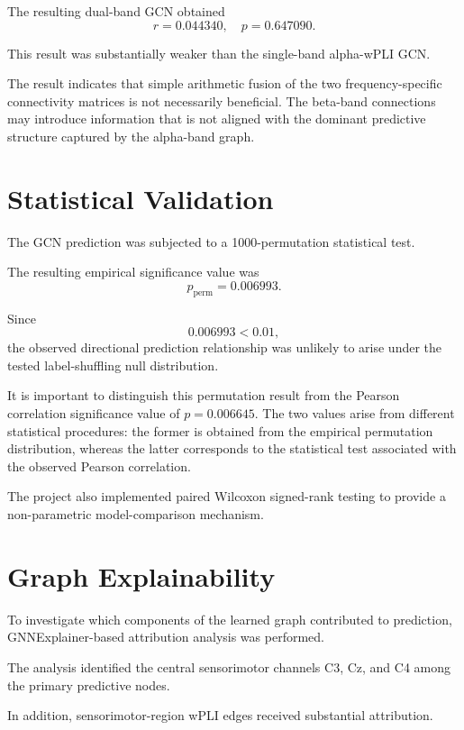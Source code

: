 \documentclass[conference]{IEEEtran}
\begin{document}
The resulting dual-band GCN obtained
\begin{equation}
r = 0.044340, \quad p = 0.647090.
\end{equation}

This result was substantially weaker than the single-band alpha-wPLI GCN.

The result indicates that simple arithmetic fusion of the two frequency-specific connectivity matrices is not necessarily beneficial. The beta-band connections may introduce information that is not aligned with the dominant predictive structure captured by the alpha-band graph.

\section{Statistical Validation}
The GCN prediction was subjected to a 1000-permutation statistical test.

The resulting empirical significance value was
\begin{equation}
p_{\text{perm}} = 0.006993.
\end{equation}

Since
\begin{equation}
0.006993 < 0.01,
\end{equation}
the observed directional prediction relationship was unlikely to arise under the tested label-shuffling null distribution.

It is important to distinguish this permutation result from the Pearson correlation significance value of $p = 0.006645$. The two values arise from different statistical procedures: the former is obtained from the empirical permutation distribution, whereas the latter corresponds to the statistical test associated with the observed Pearson correlation.

The project also implemented paired Wilcoxon signed-rank testing to provide a non-parametric model-comparison mechanism.

\section{Graph Explainability}
To investigate which components of the learned graph contributed to prediction, GNNExplainer-based attribution analysis was performed.

The analysis identified the central sensorimotor channels C3, Cz, and C4 among the primary predictive nodes.

In addition, sensorimotor-region wPLI edges received substantial attribution.
\end{document}
